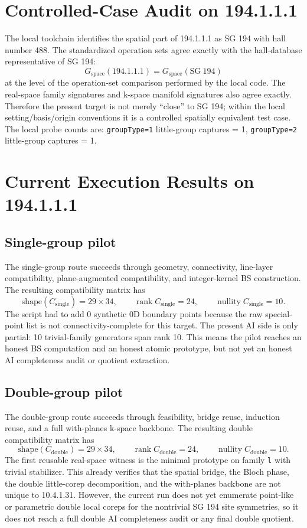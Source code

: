 \documentclass[11pt]{article}
\begin{document}
\section{Controlled-Case Audit on 194.1.1.1}
The local toolchain identifies the spatial part of 194.1.1.1 as SG 194 with hall number 488. The standardized operation sets agree exactly with the hall-database representative of SG 194:
\[
G_{\mathrm{space}}(194.1.1.1) = G_{\mathrm{space}}(\mathrm{SG}\ 194)
\]
at the level of the operation-set comparison performed by the local code. The real-space family signatures and k-space manifold signatures also agree exactly. Therefore the present target is not merely ``close'' to SG 194; within the local setting/basis/origin conventions it is a controlled spatially equivalent test case. The local probe counts are: \texttt{groupType=1} little-group captures = 1, \texttt{groupType=2} little-group captures = 1.

\section{Current Execution Results on 194.1.1.1}
\subsection*{Single-group pilot}
The single-group route succeeds through geometry, connectivity, line-layer compatibility, plane-augmented compatibility, and integer-kernel BS construction. The resulting compatibility matrix has
\[
\mathrm{shape}(C_{\mathrm{single}}) = 29 \times 34, \qquad
\operatorname{rank} C_{\mathrm{single}} = 24, \qquad
\operatorname{nullity} C_{\mathrm{single}} = 10.
\]
The script had to add 0 synthetic 0D boundary points because the raw special-point list is not connectivity-complete for this target. The present AI side is only partial: 10 trivial-family generators span rank 10. This means the pilot reaches an honest BS computation and an honest atomic prototype, but not yet an honest AI completeness audit or quotient extraction.

\subsection*{Double-group pilot}
The double-group route succeeds through feasibility, bridge reuse, induction reuse, and a full with-planes k-space backbone. The resulting double compatibility matrix has
\[
\mathrm{shape}(C_{\mathrm{double}}) = 29 \times 34, \qquad
\operatorname{rank} C_{\mathrm{double}} = 24, \qquad
\operatorname{nullity} C_{\mathrm{double}} = 10.
\]
The first reusable real-space witness is the minimal prototype on family \texttt{l} with trivial stabilizer. This already verifies that the spatial bridge, the Bloch phase, the double little-corep decomposition, and the with-planes backbone are not unique to 10.4.1.31. However, the current run does not yet enumerate point-like or parametric double local coreps for the nontrivial SG 194 site symmetries, so it does not reach a full double AI completeness audit or any final double quotient.
\end{document}
